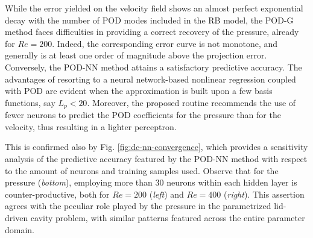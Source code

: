\documentclass[longtitle]{elsarticle}
\numberwithin{equation}{section}
\theoremstyle{theorem}
\theoremstyle{definition}
\theoremstyle{remark}
\theoremstyle{proposition}
\numberwithin{figure}{section}
\begin{document}
		While the error yielded on the velocity field shows an almost perfect exponential decay with the number of POD modes included in the RB model, the POD-G method faces difficulties in providing a correct recovery of the pressure, already for $Re = 200$. Indeed, the corresponding error curve is not monotone, and generally is at least one order of magnitude above the projection error. Conversely, the POD-NN method attains a satisfactory predictive accuracy. The advantages of resorting to a neural network-based nonlinear regression coupled with POD are evident when the approximation is built upon a few basis functions, say $L_p < 20$. Moreover, the proposed routine recommends the use of fewer neurons to predict the POD coefficients for the pressure than for the velocity, thus resulting in a lighter perceptron. 
		
		This is confirmed also by Fig. \ref{fig:dc-nn-convergence}, which provides a sensitivity analysis of the predictive accuracy featured by the POD-NN method with respect to the amount of neurons and training samples used. Observe that for the pressure (\emph{bottom}), employing more than $30$ neurons within each hidden layer is counter-productive, both for $Re = 200$ (\emph{left}) and $Re = 400$ (\emph{right}). This assertion agrees with the peculiar role played by the pressure in the parametrized lid-driven cavity problem, with similar patterns featured across the entire parameter domain. 
		
\end{document}
